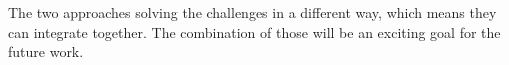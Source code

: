 \documentclass[article]{aaltoseries}
\begin{document}
The two approaches solving the challenges in a different way, which means they can integrate together. 
The combination of those will be an exciting goal for the future work. 







\end{document}
